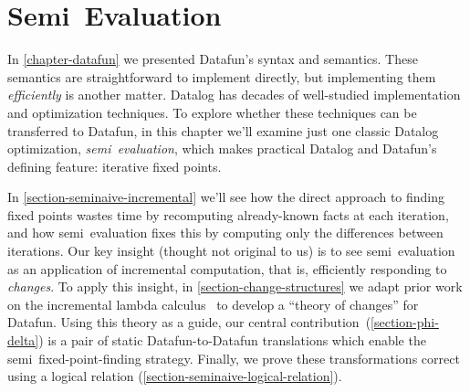 \chapter{Semi\naive\ Evaluation}
\label{chapter-seminaive}

\noindent
In \cref{chapter-datafun} we presented Datafun's syntax and semantics. These semantics are straightforward to implement directly, but implementing them \emph{efficiently} is another matter. Datalog has decades of well-studied implementation and optimization techniques.
%
To explore whether these techniques can be transferred to Datafun, in this
chapter we'll examine just one classic Datalog optimization,
\emph{semi\naive\ evaluation}, which makes practical Datalog and Datafun's
defining feature: iterative fixed points.

In \cref{section-seminaive-incremental} we'll see how the direct approach to finding fixed points wastes time by recomputing already-known facts at each iteration, and how semi\naive\ evaluation fixes this by computing only the differences between iterations. Our key insight (thought not original to us) is to see semi\naive\ evaluation as an application of incremental computation, that is, efficiently responding to \emph{changes}. To apply this insight, in \cref{section-change-structures} we adapt prior work on the incremental lambda calculus~\citep{incremental} to develop a ``theory of changes'' for Datafun. Using this theory as a guide, our central contribution~(\cref{section-phi-delta}) is a pair of static Datafun-to-Datafun translations which enable the semi\naive\ fixed-point-finding strategy. Finally, we prove these transformations correct using a logical relation  (\cref{section-seminaive-logical-relation}).








